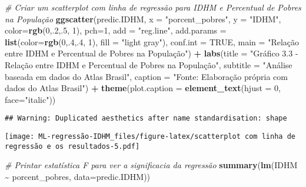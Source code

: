 \documentclass[
]{article}
\newenvironment{Shaded}{\begin{snugshade}}{\end{snugshade}}
\newcommand{\AttributeTok}[1]{\textcolor[rgb]{0.13,0.29,0.53}{#1}}
\newcommand{\CommentTok}[1]{\textcolor[rgb]{0.56,0.35,0.01}{\textit{#1}}}
\newcommand{\ConstantTok}[1]{\textcolor[rgb]{0.56,0.35,0.01}{#1}}
\newcommand{\DecValTok}[1]{\textcolor[rgb]{0.00,0.00,0.81}{#1}}
\newcommand{\FunctionTok}[1]{\textcolor[rgb]{0.13,0.29,0.53}{\textbf{#1}}}
\newcommand{\NormalTok}[1]{#1}
\newcommand{\SpecialCharTok}[1]{\textcolor[rgb]{0.81,0.36,0.00}{\textbf{#1}}}
\newcommand{\StringTok}[1]{\textcolor[rgb]{0.31,0.60,0.02}{#1}}
\begin{document}
\begin{Shaded}
\begin{Highlighting}[]
\CommentTok{\# Criar um scatterplot com linha de regressão para IDHM e Percentual de Pobres na População}
\FunctionTok{ggscatter}\NormalTok{(predic.IDHM, }\AttributeTok{x =} \StringTok{"porcent\_pobres"}\NormalTok{, }\AttributeTok{y =} \StringTok{"IDHM"}\NormalTok{, }
          \AttributeTok{color=}\FunctionTok{rgb}\NormalTok{(}\DecValTok{0}\NormalTok{,.}\DecValTok{2}\NormalTok{,.}\DecValTok{5}\NormalTok{,  }\DecValTok{1}\NormalTok{), }\AttributeTok{pch=}\DecValTok{1}\NormalTok{, }\AttributeTok{add =} \StringTok{"reg.line"}\NormalTok{, }
          \AttributeTok{add.params =} \FunctionTok{list}\NormalTok{(}\AttributeTok{color=}\FunctionTok{rgb}\NormalTok{(}\DecValTok{0}\NormalTok{,.}\DecValTok{4}\NormalTok{,.}\DecValTok{4}\NormalTok{,  }\DecValTok{1}\NormalTok{), }\AttributeTok{fill =} \StringTok{"light gray"}\NormalTok{), }
          \AttributeTok{conf.int =} \ConstantTok{TRUE}\NormalTok{, }\AttributeTok{main =} \StringTok{"Relação entre IDHM e Percentual de Pobres na População"}\NormalTok{) }\SpecialCharTok{+}
  \FunctionTok{labs}\NormalTok{(}\AttributeTok{title =} \StringTok{"Gráfico 3.3 {-} Relação entre IDHM e Percentual de Pobres na População"}\NormalTok{,}
       \AttributeTok{subtitle =} \StringTok{"Análise baseada em dados do Atlas Brasil"}\NormalTok{,}
       \AttributeTok{caption =} \StringTok{"Fonte: Elaboração própria com dados do Atlas Brasil"}\NormalTok{) }\SpecialCharTok{+}
  \FunctionTok{theme}\NormalTok{(}\AttributeTok{plot.caption =} \FunctionTok{element\_text}\NormalTok{(}\AttributeTok{hjust =} \DecValTok{0}\NormalTok{, }\AttributeTok{face=}\StringTok{"italic"}\NormalTok{))}
\end{Highlighting}
\end{Shaded}

\begin{verbatim}
## Warning: Duplicated aesthetics after name standardisation: shape
\end{verbatim}

\texttt{[image: ML-regressão-IDHM\_files/figure-latex/scatterplot com linha de regressão e os resultados-5.pdf]}

\begin{Shaded}
\begin{Highlighting}[]
\CommentTok{\# Printar estatística F para ver a significacia da regressão}
\FunctionTok{summary}\NormalTok{(}\FunctionTok{lm}\NormalTok{(IDHM }\SpecialCharTok{\textasciitilde{}}\NormalTok{ porcent\_pobres, }\AttributeTok{data=}\NormalTok{predic.IDHM))}
\end{Highlighting}
\end{Shaded}
\end{document}

